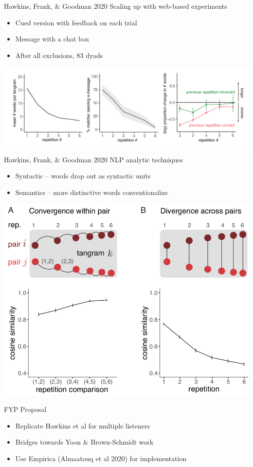 \documentclass[12pt, xcolor=beamer,table,usenames,dvipsnames, ignorenonframetext, ngerman,t]{beamer}
\begin{document}
\begin{frame}{Hawkins, Frank, \& Goodman 2020}
Scaling up with web-based experiments
\begin{itemize}
	\item Cued version with feedback on each trial
	\item Message with a chat box
	\item After all exclusions, 83 dyads 
\end{itemize}
\includegraphics[width=\textwidth]{images/hawkins_fewer_words.png}
\end{frame}
%
\begin{frame}{Hawkins, Frank, \& Goodman 2020}
	NLP analytic techniques
	\begin{itemize}
		\item Syntactic -- words drop out as syntactic units
		\item Semantics -- more distinctive words conventionalize
	\end{itemize}
\includegraphics[width=.7\textwidth]{images/hawkins_converge.png}
\end{frame}
%
\begin{frame}{FYP Proposal}
	\begin{itemize}
		\item Replicate Hawkins et al for multiple listeners
		\item Bridges towards Yoon \& Brown-Schmidt work
		\item Use Empirica (Almaatouq et al 2020) for implementation
	\end{itemize}

\end{frame}
\end{document}
